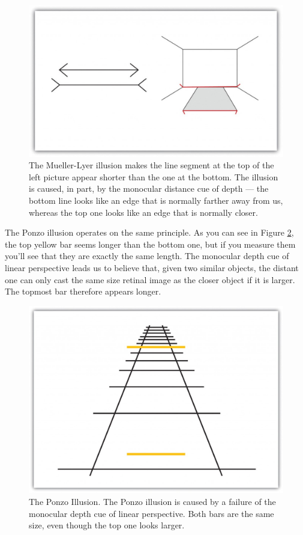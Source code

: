 \documentclass[
]{krantz}
\begin{document}
\begin{figure}

{\centering \includegraphics[width=0.6\linewidth]{images/ch2/fig5} 

}

\caption{The Mueller-Lyer illusion makes the line segment at the top of the left picture appear shorter than the one at the bottom. The illusion is caused, in part, by the monocular distance cue of depth — the bottom line looks like an edge that is normally farther away from us, whereas the top one looks like an edge that is normally closer.}\label{fig:muellerlyer}
\end{figure}

The Ponzo illusion operates on the same principle. As you can see in Figure \ref{fig:ponzoillusion}, the top yellow bar seems longer than the bottom one, but if you measure them you'll see that they are exactly the same length. The monocular depth cue of linear perspective leads us to believe that, given two similar objects, the distant one can only cast the same size retinal image as the closer object if it is larger. The topmost bar therefore appears longer.

\begin{figure}

{\centering \includegraphics[width=0.6\linewidth]{images/ch2/fig7} 

}

\caption{The Ponzo Illusion. The Ponzo illusion is caused by a failure of the monocular depth cue of linear perspective. Both bars are the same size, even though the top one looks larger.}\label{fig:ponzoillusion}
\end{figure}
\end{document}

